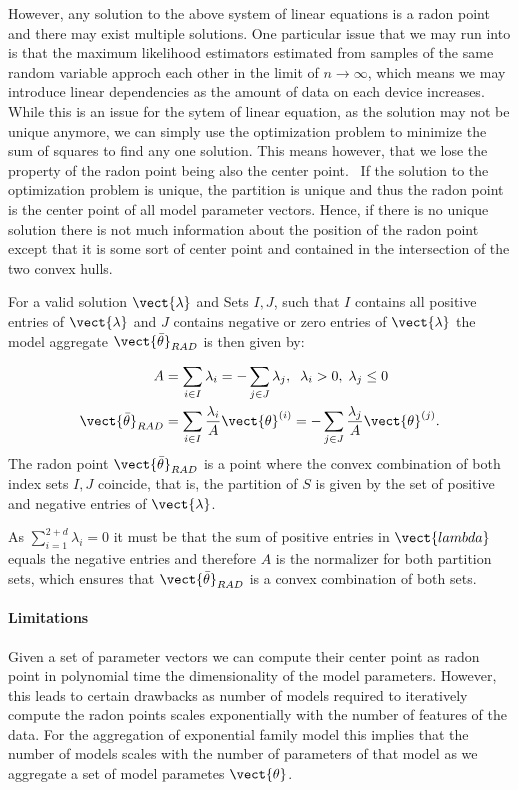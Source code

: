 However, any solution to the above system of linear equations is a radon point and there may exist multiple solutions.
One particular issue that we may run into is that the maximum likelihood estimators estimated from samples of the same random variable approch each other in the limit of $n \rightarrow \infty$, which means we may introduce linear dependencies as the amount of data on each device increases.
While this is an issue for the sytem of linear equation, as the solution may not be unique anymore, we can simply use the optimization problem to minimize the sum of squares to find any one solution.
This means however, that we lose the property of the radon point being also the center point.~\cite{peterson1972geometry}
If the solution to the optimization problem is unique, the partition is unique and thus the radon point is the center point of all model parameter vectors.
Hence, if there is no unique solution there is not much information about the position of the radon point except that it is some sort of center point and contained in the intersection of the two convex hulls.

For a valid solution $\vect{\lambda}$ and Sets $I,J$, such that $I$ contains all positive entries of $\vect{\lambda}$ and $J$ contains negative or zero entries of $\vect{\lambda}$ the model aggregate $\vect{\bar{\theta}}_{RAD}$ is then given by:

\begin{equation}
    \label{eq:radonpoint}
    \begin{split}
    A &= \sum_{i\in I} \lambda_i = - \sum_{j\in J} \lambda_j, \; \;\lambda_i > 0, \; \lambda_j \leq 0 \\
    \vect{\bar{\theta}}_{RAD} &= \sum_{i\in I} \frac{\lambda_i}{A} \vect{\theta}^{(i)} = - \sum_{j\in J} \frac{\lambda_j}{A} \vect{\theta}^{(j)}.
    \end{split}
\end{equation}
The radon point $\vect{\bar{\theta}}_{RAD}$ is a point where the convex combination of both index sets $I, J$ coincide, that is, the partition of $S$ is given by the set of positive and negative entries of $\vect{\lambda}$.

As $\sum_{i=1}^{2+d} \lambda_i = 0$ it must be that the sum of positive entries in $\vect{lambda}$ equals the negative entries and therefore $A$ is the normalizer for both partition sets, which ensures that $\vect{\bar{\theta}}_{RAD}$ is a convex combination of both sets.

\paragraph*{Limitations}
Given a set of parameter vectors we can compute their center point as radon point in polynomial time \wrt the dimensionality of the model parameters.
However, this leads to certain drawbacks as number of models required to iteratively compute the radon points scales exponentially with the number of features of the data.
For the aggregation of exponential family model this implies that the number of models scales with the number of parameters of that model as we aggregate a set of model parametes $\vect{\theta}$.


